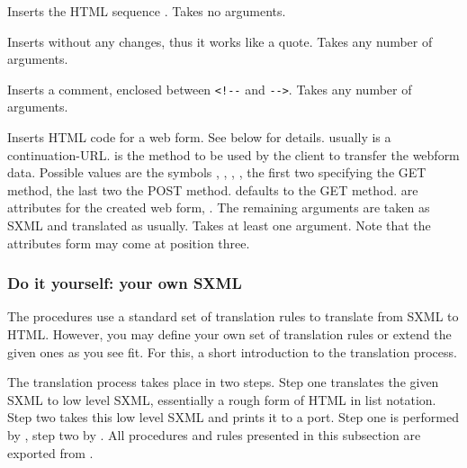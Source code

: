 \begin{desc}
  Inserts the HTML sequence .  Takes no arguments.
\end{desc}

\begin{desc}
  Inserts  without any changes, thus it works like a quote.
  Takes any number of arguments.
\end{desc}

\begin{desc}
  Inserts a comment, \ie {} enclosed between \verb|<!--|
  and \verb|-->|.  Takes any number of arguments.
\end{desc}

\begin{desc}
  Inserts HTML code for a web form.  See below for details.
   usually is a continuation-URL.   is the
  method to be used by the client to transfer the webform data.
  Possible values are the symbols , , ,
  , the first two specifying the GET method, the last two the
  POST method.   defaults to the GET method.
   are attributes for the created web form, \eg {}.  The remaining arguments are taken as
  SXML and translated as usually.  Takes at least one argument.  Note
  that the attributes form may come at position three.
\end{desc}

\subsubsection{Do it yourself: your own SXML}

The  procedures use a standard set of translation rules
to translate from SXML to HTML.  However, you may define your own set
of translation rules or extend the given ones as you see fit.  For
this, a short introduction to the translation process.

The translation process takes place in two steps.  Step one translates
the given SXML to low level SXML, essentially a rough form of HTML in
list notation.  Step two takes this low level SXML and prints it to a
port.  Step one is performed by , step two by
.  All procedures and rules presented in
this subsection are exported from .

